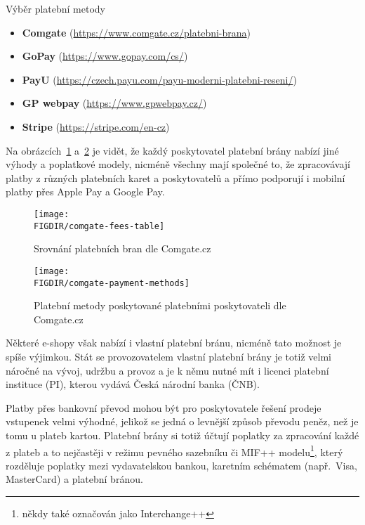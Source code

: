 \begin{subsection}{Výběr platební metody}
    \begin{itemize}
        \item \textbf{Comgate} (\url{https://www.comgate.cz/platebni-brana})
        \item \textbf{GoPay} (\url{https://www.gopay.com/cs/})
        \item \textbf{PayU} (\url{https://czech.payu.com/payu-moderni-platebni-reseni/})
        \item \textbf{GP webpay} (\url{https://www.gpwebpay.cz/})
        \item \textbf{Stripe} (\url{https://stripe.com/en-cz})
    \end{itemize}

    Na obrázcích~\ref{fig:comgate-fees-table} a~\ref{fig:comgate-payment-methods} je vidět, že každý poskytovatel platební brány nabízí jiné výhody a poplatkové modely, nicméně všechny mají společné to, že zpracovávají platby z různých platebních karet a poskytovatelů a přímo podporují i mobilní platby přes Apple Pay a Google Pay.

    \begin{figure}[H]
        \texttt{[image: \\FIGDIR/comgate-fees-table]}
        \centering
        \caption{Srovnání platebních bran dle Comgate.cz~\cite{comgate_srovnani_platebnich_bran}}
        \label{fig:comgate-fees-table}
    \end{figure}

    \begin{figure}[H]
        \texttt{[image: \\FIGDIR/comgate-payment-methods]}
        \centering
        \caption{Platební metody poskytované platebními poskytovateli dle Comgate.cz~\cite{comgate_srovnani_platebnich_bran}}
        \label{fig:comgate-payment-methods}
    \end{figure}

    Některé e-shopy však nabízí i vlastní platební bránu, nicméně tato možnost je spíše výjimkou.
    Stát se provozovatelem vlastní platební brány je totiž velmi náročné na vývoj, udržbu a provoz a je k němu nutné mít i licenci platební instituce (PI)\cite{schejbal_platebni_instituce}, kterou vydává Česká národní banka (ČNB)\cite{cnb_dohled_platebni_instituce}.

    Platby přes bankovní převod mohou být pro poskytovatele řešení prodeje vstupenek velmi výhodné, jelikož se jedná o levnější způsob převodu peněz, než je tomu u plateb kartou.
    Platební brány si totiž účtují poplatky za zpracování každé z plateb a to nejčastěji v režimu pevného sazebníku či MIF++ modelu\footnote{někdy také označován jako Interchange++}, který rozděluje poplatky mezi vydavatelskou bankou, karetním schématem (např.\ Visa, MasterCard) a platební bránou\cite{gp_podpora_mif}.


\end{subsection}
